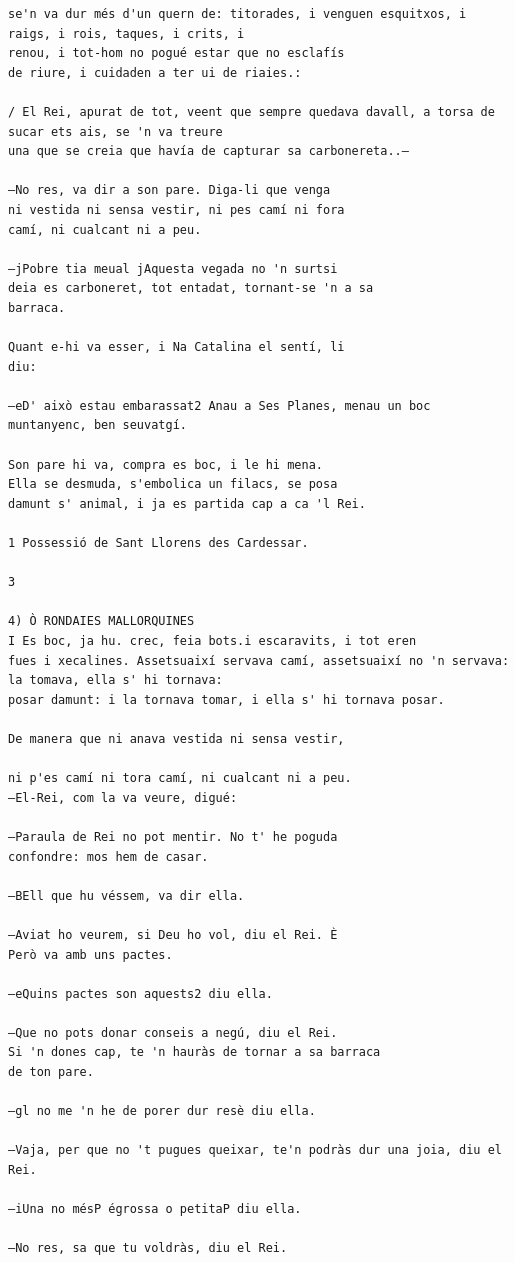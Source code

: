 \documentclass[
  letterpaper,
  DIV=11,
  numbers=noendperiod]{scrreprt}
\begin{document}
\begin{verbatim}
se'n va dur més d'un quern de: titorades, i venguen esquitxos, i raigs, i rois, taques, i crits, i
renou, i tot-hom no pogué estar que no esclafís
de riure, i cuidaden a ter ui de riaies.:

/ El Rei, apurat de tot, veent que sempre quedava davall, a torsa de sucar ets ais, se 'n va treure
una que se creia que havía de capturar sa carbonereta..—

—No res, va dir a son pare. Diga-li que venga
ni vestida ni sensa vestir, ni pes camí ni fora
camí, ni cualcant ni a peu.

—jPobre tia meual jAquesta vegada no 'n surtsi
deia es carboneret, tot entadat, tornant-se 'n a sa
barraca.

Quant e-hi va esser, i Na Catalina el sentí, li
diu:

—eD' això estau embarassat2 Anau a Ses Planes, menau un boc muntanyenc, ben seuvatgí.

Son pare hi va, compra es boc, i le hi mena.
Ella se desmuda, s'embolica un filacs, se posa
damunt s' animal, i ja es partida cap a ca 'l Rei.

1 Possessió de Sant Llorens des Cardessar.

3

4) Ò RONDAIES MALLORQUINES
I Es boc, ja hu. crec, feia bots.i escaravits, i tot eren
fues i xecalines. Assetsuaixí servava camí, assetsuaixí no 'n servava: la tomava, ella s' hi tornava:
posar damunt: i la tornava tomar, i ella s' hi tornava posar.

De manera que ni anava vestida ni sensa vestir,

ni p'es camí ni tora camí, ni cualcant ni a peu.
—El-Rei, com la va veure, digué:

—Paraula de Rei no pot mentir. No t' he poguda
confondre: mos hem de casar.

—BEll que hu véssem, va dir ella.

—Aviat ho veurem, si Deu ho vol, diu el Rei. È
Però va amb uns pactes.

—eQuins pactes son aquests2 diu ella.

—Que no pots donar conseis a negú, diu el Rei.
Si 'n dones cap, te 'n hauràs de tornar a sa barraca
de ton pare.

—gl no me 'n he de porer dur resè diu ella.

—Vaja, per que no 't pugues queixar, te'n podràs dur una joia, diu el Rei.

—iUna no mésP égrossa o petitaP diu ella.

—No res, sa que tu voldràs, diu el Rei.


\end{verbatim}
\end{document}
